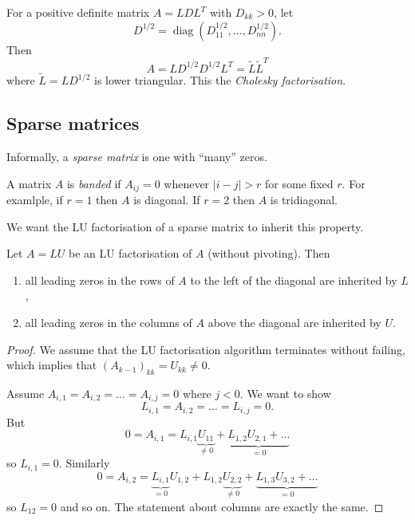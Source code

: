 \documentclass[a4paper]{article}
\begin{document}
For a positive definite matrix \(A = LDL^T\) with \(D_{kk} > 0\), let
\[
  D^{1/2} = \operatorname{diag}(D_{11}^{1/2}, \dots, D_{nn}^{1/2}).
\]
Then
\[
  A = LD^{1/2}D^{1/2}L^T = \tilde L \tilde L^T
\]
where \(\tilde L = LD^{1/2}\) is lower triangular. This the \emph{Cholesky factorisation}.

\subsection{Sparse matrices}

Informally, a \emph{sparse matrix} is one with ``many'' zeros.

\begin{eg}
  A matrix \(A\) is \emph{banded} if \(A_{ij} = 0\) whenever \(|i - j| > r\) for some fixed \(r\). For examlple, if \(r = 1\) then \(A\) is diagonal. If \(r = 2\) then \(A\) is tridiagonal.
\end{eg}

We want the LU factorisation of a sparse matrix to inherit this property.

\begin{theorem}
  Let \(A = LU\) be an LU factorisation of \(A\) (without pivoting). Then
  \begin{enumerate}
  \item all leading zeros in the rows of \(A\) to the left of the diagonal are inherited by \(L\),
  \item all leading zeros in the columns of \(A\) above the diagonal are inherited by \(U\).
  \end{enumerate}
\end{theorem}

\begin{proof}
  We assume that the LU factorisation algorithm terminates without failing, which implies that \((A_{k - 1})_{kk} = U_{kk} \neq 0\).

  Assume \(A_{i, 1} = A_{i, 2} = \dots = A_{i, j} = 0\) where \(j < 0\). We want to show
  \[
    L_{i, 1} = A_{i, 2} = \dots = L_{i, j} = 0.
  \]
  But
  \[
    0 = A_{i, 1} = L_{i, 1}\underbrace{U_{11}}_{\neq 0} + \underbrace{L_{1, 2}U_{2, 1} + \dots}_{= 0}
  \]
  so \(L_{i, 1} = 0\). Similarly
  \[
    0 = A_{i, 2} = \underbrace{L_{i, 1}}_{= 0}U_{1, 2} + L_{1, 2}\underbrace{U_{2, 2}}_{\neq 0} + \underbrace{L_{1, 3}U_{3, 2} + \dots}_{= 0}
  \]
  so \(L_{12} = 0\) and so on. The statement about columns are exactly the same.
\end{proof}
\end{document}
